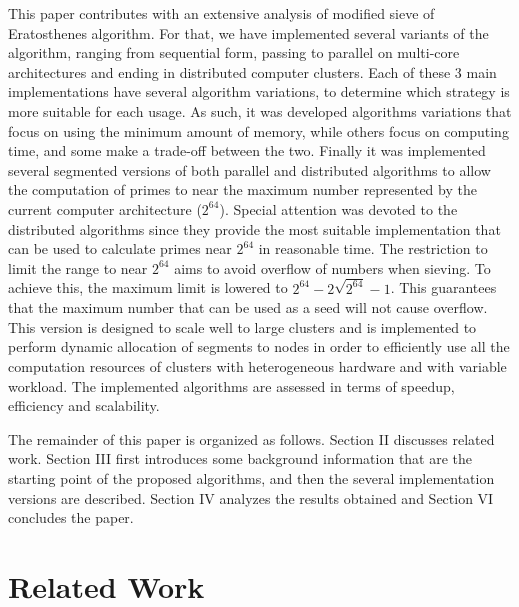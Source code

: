 \documentclass[runningheads,a4paper]{llncs}
\begin{document}
This paper contributes with an extensive analysis of modified sieve of Eratosthenes algorithm. For that, we have implemented several variants of the algorithm, ranging from sequential form, passing to parallel on multi-core architectures and ending in distributed computer clusters. Each of these 3 main implementations have several algorithm variations, to determine which strategy is more suitable for each usage. As such, it was developed algorithms variations that focus on using the minimum amount of memory, while others focus on computing time, and some make a trade-off between the two. Finally it was implemented several segmented versions of both parallel and distributed algorithms to allow the computation of primes to near the maximum number represented by the current computer architecture ($2^{64}$). Special attention was devoted to the distributed algorithms since they provide the most suitable implementation that can be used to calculate primes near $2^{64}$ in reasonable time. The restriction to limit the range to near $2^{64}$ aims to avoid overflow of numbers when sieving. To achieve this, the maximum limit is lowered to $2^{64} - 2 \sqrt{2^{64}} - 1$. This guarantees that the maximum number that can be used as a seed will not cause overflow. This version is designed to scale well to large clusters and is implemented to perform dynamic allocation of segments to nodes in order to efficiently use all the computation resources of clusters with heterogeneous hardware and with variable workload. The implemented algorithms are assessed in terms of speedup, efficiency and scalability.

The remainder of this paper is organized as follows. Section II discusses related work. Section III first introduces some background information that are the starting point of the proposed algorithms, and then the several implementation versions are described. Section IV analyzes the results obtained and Section VI concludes the paper.


\section{Related Work}
\label{Related Work}
\end{document}
